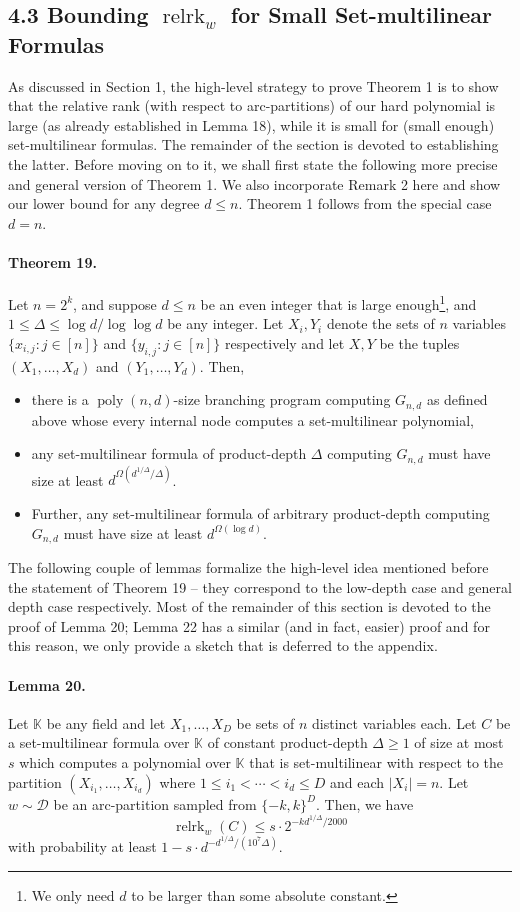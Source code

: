 \documentclass[10pt,a4paper]{article}
\begin{document}
\subsection*{4.3 Bounding $\operatorname{relrk}_w$ for Small Set-multilinear Formulas}
As discussed in Section 1, the high-level strategy to prove Theorem 1 is to show that the relative rank (with respect to arc-partitions) of our hard polynomial is large (as already established in Lemma 18), while it is small for (small enough) set-multilinear formulas. The remainder of the section is devoted to establishing the latter. Before moving on to it, we shall first state the following more precise and general version of Theorem 1. We also incorporate Remark 2 here and show our lower bound for any degree $d\leq n$. Theorem 1 follows from the special case $d=n$.

\paragraph{Theorem 19.} Let $n=2^k$, and suppose $d\leq n$ be an even integer that is large enough\footnote{We only need $d$ to be larger than some absolute constant.}, and $1\leq\Delta\leq\log d/\log\log d$ be any integer. Let $X_i,Y_i$ denote the sets of $n$ variables $\{x_{i,j}:j\in[n]\}$ and $\{y_{i,j}:j\in[n]\}$ respectively and let $X,Y$ be the tuples $(X_1,\ldots,X_d)$ and $(Y_1,\ldots,Y_d)$. Then,
\begin{itemize}
\item there is a $\operatorname{poly}(n,d)$-size branching program computing $G_{n,d}$ as defined above whose every internal node computes a set-multilinear polynomial,
\item any set-multilinear formula of product-depth $\Delta$ computing $G_{n,d}$ must have size at least $d^{\Omega(d^{1/\Delta}/\Delta)}$.
\item Further, any set-multilinear formula of arbitrary product-depth computing $G_{n,d}$ must have size at least $d^{\Omega(\log d)}$.
\end{itemize}

The following couple of lemmas formalize the high-level idea mentioned before the statement of Theorem 19 -- they correspond to the low-depth case and general depth case respectively. Most of the remainder of this section is devoted to the proof of Lemma 20; Lemma 22 has a similar (and in fact, easier) proof and for this reason, we only provide a sketch that is deferred to the appendix.
\paragraph{Lemma 20.} Let $\mathbb K$ be any field and let $X_1,\ldots,X_D$ be sets of $n$ distinct variables each. Let $C$ be a set-multilinear formula over $\mathbb K$ of constant product-depth $\Delta\geq1$ of size at most $s$ which computes a polynomial over $\mathbb K$ that is set-multilinear with respect to the partition $(X_{i_1},\ldots,X_{i_d})$ where $1\leq i_1<\cdots<i_d\leq D$ and each $|X_i|=n$. Let $w\sim\mathcal D$ be an arc-partition sampled from $\{-k,k\}^D$. Then, we have
\[\operatorname{relrk}_w(C)\leq s\cdot2^{-kd^{1/\Delta}/2000}\]
with probability at least $1-s\cdot d^{-d^{1/\Delta}/(10^7\Delta)}$.
\end{document}
